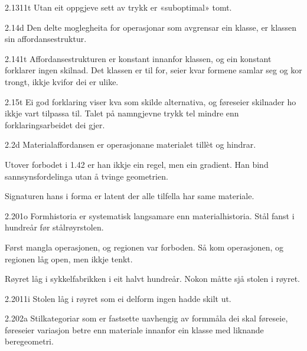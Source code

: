 \begin{formproposition}{2.1311}{t}
Utan eit oppgjeve sett av trykk er «suboptimal» tomt.
\end{formproposition}

\begin{formproposition}{2.14}{d}
Den delte moglegheita for operasjonar som avgrensar ein klasse, er klassen sin affordansestruktur.
\end{formproposition}

\begin{formproposition}{2.141}{t}
Affordansestrukturen er konstant innanfor klassen, og ein konstant forklarer ingen skilnad. Det klassen er til for, seier kvar formene samlar seg og kor trongt, ikkje kvifor dei er ulike.
\end{formproposition}

\begin{formproposition}{2.15}{t}
Ei god forklaring viser kva som skilde alternativa, og føreseier skilnader ho ikkje vart tilpassa til. Talet på namngjevne trykk tel mindre enn forklaringsarbeidet dei gjer.
\end{formproposition}

\begin{formproposition}{2.2}{d}
Materialaffordansen er operasjonane materialet tillèt og hindrar.

Utover forbodet i 1.42 er han ikkje ein regel, men ein gradient. Han bind sannsynsfordelinga utan å tvinge geometrien.

Signaturen hans i forma er latent der alle tilfella har same materiale.
\end{formproposition}

\begin{formproposition}{2.201}{o}
Formhistoria er systematisk langsamare enn materialhistoria. Stål fanst i hundreår før stålrøyrstolen.

Først mangla operasjonen, og regionen var forboden. Så kom operasjonen, og regionen låg open, men ikkje tenkt.

Røyret låg i sykkelfabrikken i eit halvt hundreår. Nokon måtte sjå stolen i røyret.
\end{formproposition}

\begin{formproposition}{2.2011}{i}
Stolen låg i røyret som ei delform ingen hadde skilt ut.
\end{formproposition}

\begin{formproposition}{2.202}{a}
Stilkategoriar som er fastsette uavhengig av formmåla dei skal føreseie, føreseier variasjon betre enn materiale innanfor ein klasse med liknande beregeometri.
\end{formproposition}

